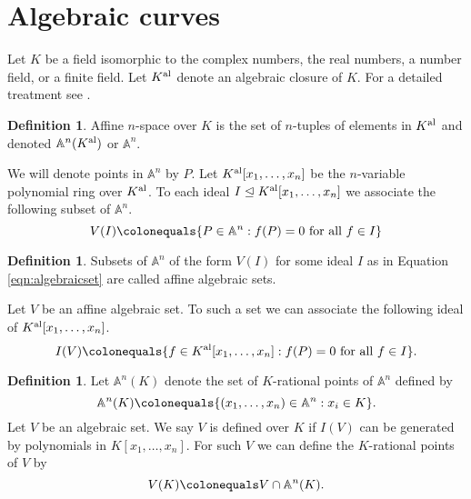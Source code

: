 \documentclass{dcthesis}
\renewcommand{\AA}{\mathbb A}
\newcommand{\defi}[1]{\textsf{#1}}
\newcommand{\Kal}{{{K}^{\textup{al}}}}
\numberwithin{equation}{section}
\theoremstyle{definition}
\newtheorem{definition}[equation]{Definition}
\theoremstyle{remark}
\begin{document}
{  \section{Algebraic curves}{\label{sec:algebraiccurves}
    Let $K$ be a field isomorphic to the complex numbers,
    the real numbers, a number field, or a finite field.
    Let $\Kal$ denote an algebraic closure of $K$.
    For a detailed treatment see
    \cite[Chapters 1-2]{silverman}.
    \begin{definition}
      \label{def:affinespace}
      \defi{Affine $n$-space} over $K$ is the
      set of $n$-tuples of elements in $\Kal$
      and denoted $\AA^n(\Kal)$ or $\AA^n$.
    \end{definition}
    We will denote \defi{points} in $\AA^n$ by $P$.
    Let $\Kal[x_1,\dots,x_n]$ be the $n$-variable
    polynomial ring over $\Kal$.
    To each ideal $I\trianglelefteq\Kal[x_1,\dots,x_n]$
    we associate the following subset of $\AA^n$.
    \begin{equation}
      \label{eqn:algebraicset}
      V(I)\colonequals
      \{P\in\AA^n : f(P) = 0 \text{ for all } f\in I\}
    \end{equation}
    \begin{definition}
      \label{def:algebraicset}
      Subsets of $\AA^n$
      of the form $V(I)$ for some ideal $I$
      as in Equation \ref{eqn:algebraicset}
      are called
      \defi{affine algebraic sets}.
    \end{definition}
    Let $V$ be an affine algebraic set.
    To such a set we can associate
    the following ideal of $\Kal[x_1,\dots,x_n]$.
    \begin{equation}
      \label{eqn:idealofalgebraicset}
      I(V)\colonequals
      \{f\in\Kal[x_1,\dots,x_n]: f(P)=0 \text{ for all }f\in I\}.
    \end{equation}
    \begin{definition}
      \label{def:definedoverK}
      Let $\AA^n(K)$ denote the set of
      \defi{$K$-rational points} of $\AA^n$ defined by
      \[
        \AA^n(K)\colonequals
        \{(x_1,\dots,x_n)\in\AA^n : x_i\in K\}.
      \]
      Let $V$ be an algebraic set.
      We say $V$ is
      \defi{defined over $K$}
      if $I(V)$ can be generated by
      polynomials in $K[x_1,\dots,x_n]$.
      For such $V$ we can define the
      \defi{$K$-rational points of $V$} by
      \[
        V(K)\colonequals
        V\cap\AA^n(K).
      \]
    \end{definition}
}}
\end{document}
